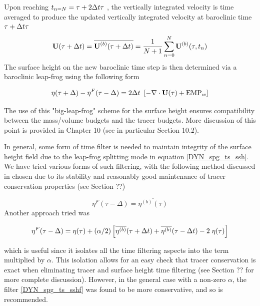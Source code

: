 {Upon reaching $t_{n=N} = \tau + 2\Delta t \tau$ , the vertically integrated velocity is time averaged to produce the updated vertically integrated velocity at baroclinic time $\tau + \Delta t \tau$ 
\begin{equation} \label{DYN_spg_ts_u}
\textbf{U}(\tau+\Delta t) = \overline{\textbf{U}^{(b)}(\tau+\Delta t)} 
 	= \frac{1}{N+1} \sum\limits_{n=0}^N\textbf{U}^{(b)}(\tau,t_{n})
\end{equation}
The surface height on the new baroclinic time step is then determined via a baroclinic leap-frog using the following form 

\begin{equation} \label{DYN_spg_ts_ssh}
\eta(\tau+\Delta) - \eta^{F}(\tau-\Delta) = 2\Delta t \ \left[ - \nabla \cdot \textbf{U}(\tau) + \text{EMP}_w \right]  
\end{equation}

 The use of this "big-leap-frog" scheme for the surface height ensures compatibility between the mass/volume budgets and the tracer budgets. More discussion of this point is provided in Chapter 10 (see in particular Section 10.2). 
 
In general, some form of time filter is needed to maintain integrity of the surface 
height field due to the leap-frog splitting mode in equation \ref{DYN_spg_ts_ssh}. We 
have tried various forms of such filtering, with the following method discussed in 
\cite{Griffies_al_MWR01} chosen due to its stability and reasonably good maintenance of 
tracer conservation properties (see Section ??) 

\begin{equation} \label{DYN_spg_ts_sshf}
\eta^{F}(\tau-\Delta) =  \overline{\eta^{(b)}(\tau)} 
\end{equation}
Another approach tried was 

\begin{equation} \label{DYN_spg_ts_sshf2}
\eta^{F}(\tau-\Delta) = \eta(\tau) 
	+ (\alpha/2) \left[\overline{\eta^{(b)}}(\tau+\Delta t)
				    + \overline{\eta^{(b)}}(\tau-\Delta t) -2 \;\eta(\tau) \right]
\end{equation}

which is useful since it isolates all the time filtering aspects into the term multiplied 
by $\alpha$. This isolation allows for an easy check that tracer conservation is exact when 
eliminating tracer and surface height time filtering (see Section ?? for more complete discussion). However, in the general case with a non-zero $\alpha$, the filter \ref{DYN_spg_ts_sshf} was found to be more conservative, and so is recommended. 

}            %

